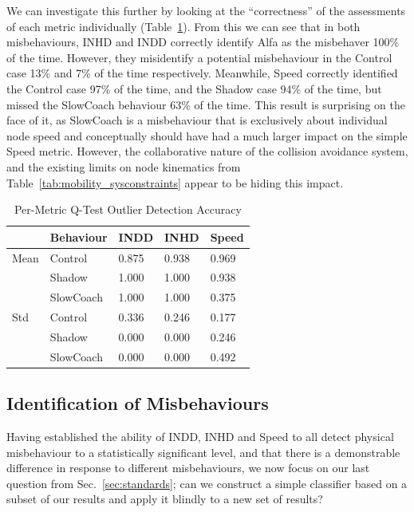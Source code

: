 \documentclass[conference,compsoc,letterpaper]{IEEEtran}
\begin{document}
We can investigate this further by looking at the ``correctness'' of the assessments of each metric individually (Table~\ref{tab:per_metric_stats}).
From this we can see that in both misbehaviours, INHD and INDD correctly identify Alfa as the misbehaver 100\% of the time. 
However, they misidentify a potential misbehaviour in the Control case 13\% and 7\% of the time respectively.
Meanwhile, Speed correctly identified the Control case 97\% of the time, and the Shadow case 94\% of the time, but missed the SlowCoach behaviour 63\% of the time. 
This result is surprising on the face of it, as SlowCoach is a misbehaviour that is exclusively about individual node speed and conceptually should have had a much larger impact on the simple Speed metric.
However, the collaborative nature of the collision avoidance system, and the existing limits on node kinematics from Table~\ref{tab:mobility_sysconstraints} appear to be hiding this impact. 

\begin{table}
  \caption{Per-Metric Q-Test Outlier Detection Accuracy}
  \centering
\begin{tabular}{lllll}
\toprule
{} & Behaviour &  INDD &  INHD & Speed \\
\midrule
Mean & Control & 0.875 & 0.938 & 0.969 \\
     & Shadow & 1.000 & 1.000 & 0.938 \\
     & SlowCoach & 1.000 & 1.000 & 0.375 \\
Std & Control & 0.336 & 0.246 & 0.177 \\
     & Shadow & 0.000 & 0.000 & 0.246 \\
     & SlowCoach & 0.000 & 0.000 & 0.492 \\
\bottomrule
\end{tabular}
  \label{tab:per_metric_stats}
\end{table}

\subsection{Identification of Misbehaviours}
Having established the ability of INDD, INHD and Speed to all detect physical misbehaviour to a statistically significant level, and that there is a demonstrable difference in response to different misbehaviours,  we now focus on our last question from Sec.~\ref{sec:standards}; can we construct a simple classifier based on a subset of our results and apply it blindly to a new set of results?
\end{document}
